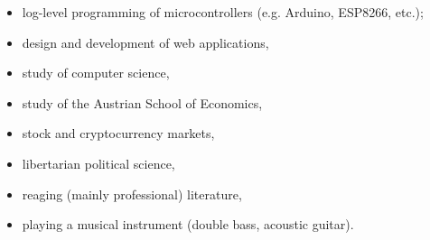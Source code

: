 
{}
\divider




\divider\smallskip





\begin{itemize}
	\item log-level programming of microcontrollers (e.g. Arduino, ESP8266, etc.);
	\item design and development of web applications,
	\item study of computer science,
	\item study of the Austrian School of Economics,
	\item stock and cryptocurrency markets,
	\item libertarian political science,
	\item reaging (mainly professional) literature,
	\item playing a musical instrument (double bass, acoustic guitar).
\end{itemize}
\cvproject{}



